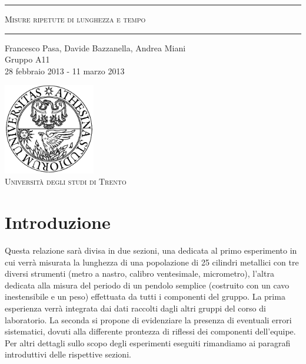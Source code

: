 \begin{titlepage}
\begin{center}

	\hrule \vspace{0.5cm}
     	\textsc{\LARGE Misure ripetute di lunghezza e tempo}
	\vspace{0.5cm} \hrule \vspace{2cm}
      	{\large Francesco Pasa, Davide Bazzanella, Andrea Miani\\
		Gruppo A11}\\
	\vspace{0.5cm}
      	{\large 28 febbraio 2013 - 11 marzo 2013}

	\vfill

    \includegraphics[width=4cm]{unitn_logo.png}\\
    \vspace{1cm}
        \textsc{\Large Università degli studi di Trento}

    \vfill 

	{\begin{abstract}
Misura della lunghezza di un gruppo di 25 cilindri di metallo e della durata del periodo di oscillazione di un pendolo semplice.
Analisi dei valori ottenuti dagli esperimenti del singolo gruppo e dei valori raccolti dagli esperimenti di tutti i gruppi di laboratorio.
	 \end{abstract}}
\end{center}
\end{titlepage}

\newpage

\vspace*{\fill}
\begin{center}
	\tableofcontents
\end{center}
\vspace*{\fill}

\newpage

\section{Introduzione}

Questa relazione sarà divisa in due sezioni, una dedicata al primo esperimento
in cui verrà misurata la lunghezza di una popolazione di 25 cilindri metallici
con tre diversi strumenti (metro a nastro, calibro ventesimale, micrometro),
l'altra dedicata alla misura del periodo di un pendolo semplice (costruito con
un cavo inestensibile e un peso) effettuata da tutti i componenti del gruppo.
La prima esperienza verrà integrata dai dati raccolti dagli altri gruppi
del corso di laboratorio. La seconda si propone di evidenziare la presenza di eventuali
errori sistematici, dovuti alla differente prontezza di riflessi dei componenti dell'equipe.
Per altri dettagli sullo scopo degli esperimenti eseguiti
rimandiamo ai paragrafi introduttivi delle rispettive sezioni.
